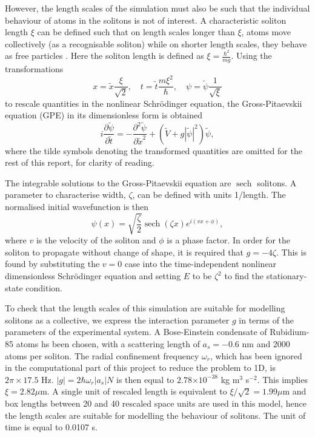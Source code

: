 \documentclass[10pt, twocolumn]{revtex4}    %
\DeclareMathOperator{\sech}{sech}		%
\providecommand{\e}[1]{\ensuremath{\times 10^{#1}}} %
\begin{document}
However, the length scales of the simulation must also be such that the individual behaviour of atoms in the solitons is not of interest. A characteristic soliton length $\xi$ can be defined such that on length scales longer than $\xi$, atoms move collectively (as a recognisable soliton) while on shorter length scales, they behave as free particles \cite{}. Here the soliton length is defined as $\xi = \frac{\hbar^2}{mg}$. Using the transformations 
\begin{equation} \label{transforms}
x = \tilde{x} \frac{\xi}{\sqrt{2}}, \quad		 t = \tilde{t} \frac{m \xi^2}{\hbar}, 	\quad \psi = \tilde{\psi} \frac{1}{\sqrt{\xi}}
\end{equation}
to rescale quantities in the nonlinear Schr\"{o}dinger equation, the Gross-Pitaevskii equation (GPE) in its dimensionless form is obtained \cite{Gross} \cite{Pitaevskii}
\begin{equation} \label{GPE}
i \frac{\partial \tilde{\psi}}{\partial \tilde{t}} = -\frac{\partial^2 \tilde{\psi}}{\partial \tilde{x}^2} + (\tilde{V}+g |\tilde{\psi}|^2) \tilde{\psi},
\end{equation}
where the tilde symbols denoting the transformed quantities are omitted for the rest of this report, for clarity of reading. 

The integrable solutions to the Gross-Pitaevskii equation are $\sech$ solitons. A parameter to characterise width, $\zeta$, can be defined with units 1/length. The normalised initial wavefunction is then 
\begin{equation} 
\psi(x) = \sqrt{\frac{\zeta}{2}} \sech{(\zeta x)} e^{i (v x + \phi)},
\end{equation}
where $v$ is the velocity of the soliton and $\phi$ is a phase factor. In order for the soliton to propagate without change of shape, it is required that $g=-4\zeta$. This is found by substituting the $v=0$ case into the time-independent nonlinear dimensionless Schr\"{o}dinger equation and setting $E$ to be $\zeta^2$ to find the stationary-state condition.  

To check that the length scales of this simulation are suitable for modelling solitons as a collective, we express the interaction parameter $g$ in terms of the parameters of the experimental system. A Bose-Einstein condensate of Rubidium-85 atoms hs been chosen, with a scattering length of $a_s = -0.6$ nm and 2000 atoms per soliton. The radial confinement frequency $\omega_r$, which has been ignored in the computational part of this project to reduce the problem to 1D, is $2\pi \times 17.5$ Hz. $|g| = 2\hbar \omega_r |a_s| N$ is then equal to $2.78 \e{-38}$ kg m$^3$ s$^{-2}$. This implies $\xi = 2.82 \mu$m. A single unit of rescaled length is equivalent to $\xi/\sqrt{2} = 1.99 \mu$m and box lengths between 20 and 40 rescaled space units are used in this model, hence the length scales are suitable for modelling the behaviour of solitons. The unit of time is equal to 0.0107 s. 
\end{document}
